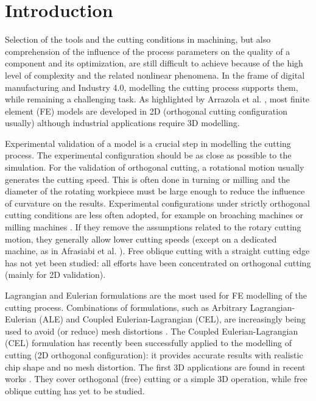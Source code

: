 \documentclass[preprint,12pt,times]{elsarticle}
\begin{document}

\linenumbers

\section{Introduction}
\label{Intro}

Selection of the tools and the cutting conditions in machining, but also comprehension of the influence of the process parameters on the quality of a component and its optimization, are still difficult to achieve because of the high level of complexity and the related nonlinear phenomena. In the frame of digital manufacturing and Industry 4.0, modelling the cutting process supports them, while remaining a challenging task. As highlighted by Arrazola et al. \cite{arrazola_Recent_2013}, most finite element (FE) models are developed in 2D (orthogonal cutting configuration usually) although industrial applications require 3D modelling.

Experimental validation of a model is a crucial step in modelling the cutting process. The experimental configuration should be as close as possible to the simulation. For the validation of orthogonal cutting, a rotational motion usually generates the cutting speed. This is often done in turning \cite{agmell_Development_2018} or milling \cite{xu_Simulation_2021} and the diameter of the rotating workpiece must be large enough to reduce the influence of curvature on the results. Experimental configurations under strictly orthogonal cutting conditions are less often adopted, for example on broaching machines \cite{abouridouane_Friction_2021} or milling machines \cite{ducobu_Experimental_2015, sela_Measurement_2021}. If they remove the assumptions related to the rotary cutting motion, they generally allow lower cutting speeds (except on a dedicated machine, as in Afrasiabi et al. \cite{afrasiabi_NumericalExperimental_2021}). Free oblique cutting with a straight cutting edge has not yet been studied: all efforts have been concentrated on orthogonal cutting (mainly for 2D validation).

Lagrangian and Eulerian formulations are the most used for FE modelling of the cutting process. Combinations of formulations, such as Arbitrary Lagrangian-Eulerian (ALE) and Coupled Eulerian-Lagrangian (CEL), are increasingly being used to avoid (or reduce) mesh distortions \cite{ducobu_Application_2016}. The Coupled Eulerian-Lagrangian (CEL) formulation has recently been successfully applied to the modelling of cutting (2D orthogonal configuration): it provides accurate results with realistic chip shape and no mesh distortion. The first 3D applications are found in recent works \cite{xu_Simulation_2021, ducobu_Finite_2017, ambrosio_New_2022, vovk_Finite_2020, hardt_Three_2021}. They cover orthogonal (free) cutting or a simple 3D operation, while free oblique cutting has yet to be studied.
\end{document}
